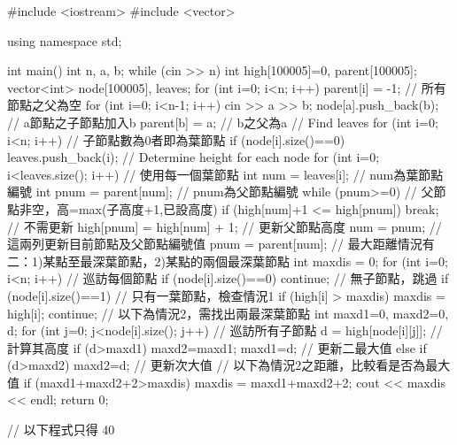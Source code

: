 \begin{cppcode}
#include <iostream>
#include <vector>

using namespace std;

int main()
{
	int n, a, b;
	while (cin >> n) {
		int high[100005]={0}, parent[100005];
		vector<int> node[100005], leaves;
		for (int i=0; i<n; i++) parent[i] = -1; // 所有節點之父為空
		for (int i=0; i<n-1; i++) {
			cin >> a >> b;
			node[a].push_back(b); // a節點之子節點加入b
			parent[b] = a; // b之父為a
		}
		// Find leaves
		for (int i=0; i<n; i++) { // 子節點數為0者即為葉節點
			if (node[i].size()==0) leaves.push_back(i);
		}
		// Determine height for each node
		for (int i=0; i<leaves.size(); i++) { // 使用每一個葉節點
			int num = leaves[i]; // num為葉節點編號
			int pnum = parent[num]; // pnum為父節點編號
			while (pnum>=0) { // 父節點非空，高=max(子高度+1,已設高度)
				if (high[num]+1 <= high[pnum]) break; // 不需更新
				high[pnum] = high[num] + 1; // 更新父節點高度
				num = pnum; // 這兩列更新目前節點及父節點編號值
				pnum = parent[num];
			}
		}
		// 最大距離情況有二：1)某點至最深葉節點，2)某點的兩個最深葉節點
		int maxdis = 0;
		for (int i=0; i<n; i++) { // 巡訪每個節點
			if (node[i].size()==0) continue; // 無子節點，跳過
			if (node[i].size()==1) { // 只有一葉節點，檢查情況1
				if (high[i] > maxdis) maxdis = high[i];
				continue;
			}
			// 以下為情況2，需找出兩最深葉節點
			int maxd1=0, maxd2=0, d; 
			for (int j=0; j<node[i].size(); j++) { // 巡訪所有子節點
				d = high[node[i][j]]; // 計算其高度
				if (d>maxd1) { maxd2=maxd1; maxd1=d; } // 更新二最大值
				else if (d>maxd2) maxd2=d; // 更新次大值
			}
			// 以下為情況2之距離，比較看是否為最大值
			if (maxd1+maxd2+2>maxdis) maxdis = maxd1+maxd2+2;
		}
		cout << maxdis << endl;
	}
	return 0;
}


// 以下程式只得 40%

\end{cppcode}	
